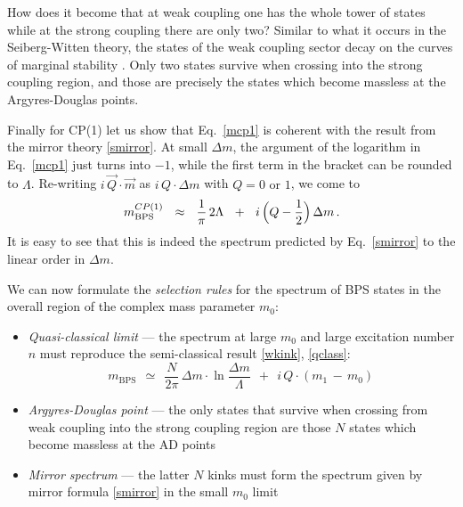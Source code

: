\documentclass[epsfig,12pt]{article}
\def\beq{\begin{equation}}
\def\eeq{\end{equation}}
\def\beq{\begin{equation}}
\def\eeq{\end{equation}}
\newcommand{\mbps}{m_\text{BPS}}
\begin{document}
	How does it become that at weak coupling one has the whole tower of states
	while at the strong coupling there are only two?
	Similar to what it occurs in the Seiberg-Witten theory, the states of the weak coupling sector
	decay on the curves of marginal stability \cite{Bilal:1996sk,Bilal:1997st}.
	Only two states survive when crossing into the strong coupling region, 
	and those are precisely the states which become massless at the Argyres-Douglas points.

	Finally for CP(1) let us show that Eq.~\eqref{mcp1} is coherent with the result from the 
	mirror theory \eqref{smirror}.
	At small $ \Delta m $, the argument of the logarithm in Eq.~\eqref{mcp1} just turns into $ -1 $, 
	while the first term in the bracket can be rounded to $ \Lambda $.
	Re-writing $ i\, \vec{Q}\cdot\vec{m} $ as $ i\, Q \cdot \Delta m $ with $ Q = 0 \text{~or~} 1 $, 
	we come to
\beq
	m_\text{BPS}^{CP(1)} ~~\approx~~ 
		\frac{1}{\pi}\, 2\Lambda  ~~+~~ i\, \Bigl(Q - \frac{1}{2}\Bigr)\, \Delta m\,.
\eeq
	It is easy to see that this is indeed the spectrum predicted by Eq.~\eqref{smirror} to the 
	linear order in $ \Delta m $.

\vspace{0.8cm}
	We can now formulate the {\it selection rules} for the spectrum of BPS states in the overall
	region of the complex mass parameter $ m_0 $:
\begin{itemize}
\item
	{\it Quasi-classical limit} --- the spectrum at large $ m_0 $ and large excitation number $ n $
	must reproduce the semi-classical result \eqref{wkink}, \eqref{qclass}:
\beq
\mbps ~~\simeq~~ \frac{N}{2\pi}\,
		\Delta m \cdot \ln \frac{\Delta m}{\Lambda}  
	    ~~+~~
	i\, Q \cdot ( m_1 \,-\, m_0 )\,
\eeq

\item
	{\it Argyres-Douglas point} --- the only states that survive when crossing from weak coupling 
	into the strong coupling region are those $ N $ states which become massless at the AD points

\item
	{\it Mirror spectrum} --- the latter $ N $ kinks must form the spectrum given by mirror 
	formula \eqref{smirror} in the small $ m_0 $ limit 
\end{itemize}

\vspace{2.0cm}

\end{document}
